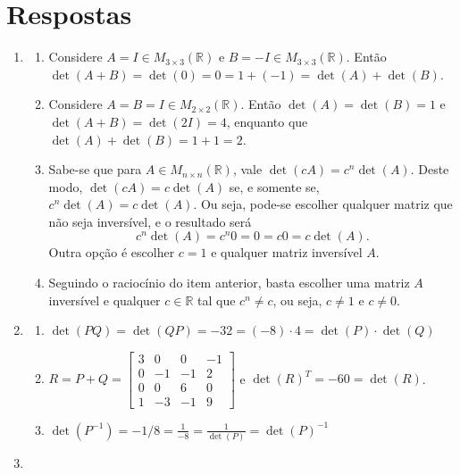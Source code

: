 \documentclass[12pt,a4paper]{article}
\newcommand\ii{\mathrm{i}}
\newcommand*\R{\mathbb{R}}
\begin{document}
\section*{Respostas}
\begin{enumerate}
\item
\begin{enumerate}
\item Considere $A = I \in M_{3 \times 3}(\R)$ e $B = -I \in M_{3 \times 3}(\R)$. Então $\det(A+B) = \det(0) = 0 = 1 + (-1) = \det(A) + \det(B)$.
\item Considere $A = B = I \in M_{2 \times 2}(\R)$. Então $\det(A) = \det(B) = 1$ e $\det(A+B) = \det(2I) = 4$, enquanto que $\det(A) + \det(B) = 1 + 1 = 2$.
\item Sabe-se que para $A \in M_{n \times n}(\R)$, vale $\det(cA) = c^n\det(A)$. Deste modo, $\det(cA) = c \det(A)$ se, e somente se, $c^n\det(A) = c\det(A)$. Ou seja, pode-se escolher qualquer matriz que não seja inversível, e o resultado será \[c^n\det(A) = c^n 0 = 0 = c 0 = c\det(A).\] Outra opção é escolher $c = 1$ e qualquer matriz inversível $A$.
\item Seguindo o raciocínio do item anterior, basta escolher uma matriz $A$ inversível e qualquer $c \in \R$ tal que $c^n \neq c$, ou seja, $c \neq 1$ e $c \neq 0$.
\end{enumerate}
\item 
\begin{enumerate}
\item $\det(PQ) =\det(QP) = -32 = (-8) \cdot 4 = \det(P) \cdot \det(Q)$
\item $R = P+Q = \begin{bmatrix}
3 &  0 &  0 & -1\\
0 & -1 & -1 &  2\\
0 &  0 &  6 &  0\\
1 & -3 & -1 &  9
\end{bmatrix}$ e $\det(R)^T = -60 = \det(R)$.
\item $\displaystyle \det(P^{-1}) = -1/8 = \frac{1}{-8} = \frac{1}{\det(P)} = \det(P)^{-1}$
\end{enumerate}
\item
{}
\end{enumerate}
\end{document}
